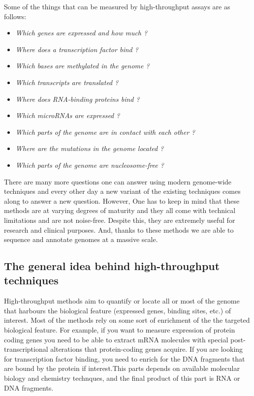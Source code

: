 \documentclass[12pt,]{krantz}
\providecommand{\tightlist}{%
  \setlength{\itemsep}{0pt}\setlength{\parskip}{0pt}}
\theoremstyle{definition}
\theoremstyle{definition}
\theoremstyle{definition}
\theoremstyle{remark}
\begin{document}
Some of the things that can be measured by high-throughput assays are as
follows:

\begin{itemize}
\tightlist
\item
  \emph{Which genes are expressed and how much ?}
\item
  \emph{Where does a transcription factor bind ?}
\item
  \emph{Which bases are methylated in the genome ?}
\item
  \emph{Which transcripts are translated ?}
\item
  \emph{Where does RNA-binding proteins bind ?}
\item
  \emph{Which microRNAs are expressed ?}
\item
  \emph{Which parts of the genome are in contact with each other ?}
\item
  \emph{Where are the mutations in the genome located ?}
\item
  \emph{Which parts of the genome are nucleosome-free ?}
\end{itemize}

There are many more questions one can answer using modern genome-wide
techniques and every other day a new variant of the existing techniques
comes along to answer a new question. However, One has to keep in mind
that these methods are at varying degrees of maturity and they all come
with technical limitations and are not noise-free. Despite this, they
are extremely useful for research and clinical purposes. And, thanks to
these methods we are able to sequence and annotate genomes at a massive
scale.

\hypertarget{the-general-idea-behind-high-throughput-techniques}{%
\subsection{The general idea behind high-throughput
techniques}\label{the-general-idea-behind-high-throughput-techniques}}

High-throughput methods aim to quantify or locate all or most of the
genome that harbours the biological feature (expressed genes, binding
sites, etc.) of interest. Most of the methods rely on some sort of
enrichment of the the targeted biological feature. For example, if you
want to measure expression of protein coding genes you need to be able
to extract mRNA molecules with special post-transcriptional alterations
that protein-coding genes acquire. If you are looking for transcription
factor binding, you need to enrich for the DNA fragments that are bound
by the protein if interest.This parts depends on available molecular
biology and chemistry technques, and the final product of this part is
RNA or DNA fragments.
\end{document}
